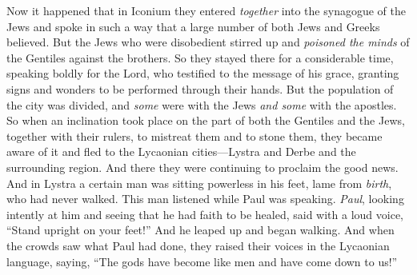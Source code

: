 \begin{biblechapter} %
 Now it happened that in Iconium they entered \textit{together} into the synagogue of the Jews and spoke in such a way that a large number of both Jews and Greeks believed.
\verse But the Jews who were disobedient stirred up and \textit{poisoned the minds} of the Gentiles against the brothers.
\verse So they stayed there for a considerable time, speaking boldly for the Lord, who testified to the message of his grace, granting signs and wonders to be performed through their hands.
\verse But the population of the city was divided, and \textit{some} were with the Jews \textit{and some} with the apostles.
\verse So when an inclination took place on the part of both the Gentiles and the Jews, together with their rulers, to mistreat them and to stone them,
\verse they became aware of it and fled to the Lycaonian cities—Lystra and Derbe and the surrounding region.
\verse And there they were continuing to proclaim the good news.
 And in Lystra a certain man was sitting powerless in his feet, lame from \textit{birth}, who had never walked.
\verse This man listened while Paul was speaking. \textit{Paul}, looking intently at him and seeing that he had faith to be healed,
\verse said with a loud voice, “Stand upright on your feet!” And he leaped up and began walking.
\verse And when the crowds saw what Paul had done, they raised their voices in the Lycaonian language, saying, “The gods have become like men and have come down to us!”

\end{biblechapter}
